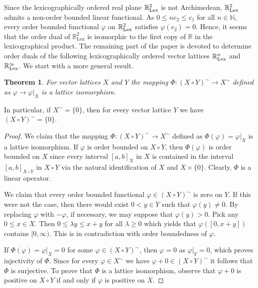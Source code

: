 \documentclass[12pt,reqno]{amsart}
\theoremstyle{plain}
\newtheorem{theorem}{Theorem}[section]
\theoremstyle{definition}
\begin{document}
Since the lexicographically ordered real plane $\mathbb R^2_{\rm{Lex}}$ is not Archimedean, $\mathbb R^2_{\rm{Lex}}$ admits a non-order bounded linear functional. As $0\leq ne_2\leq e_1$ for all $n\in \mathbb N$, every order bounded functional $\varphi$ on $\mathbb R^2_{\rm{Lex}}$ satisfies $\varphi(e_2)=0$. Hence, it seems that the order dual of $\mathbb R^2_{\mathrm{Lex}}$ is isomorphic to the first copy of $\mathbb R$ in the lexicographical product. The remaining part of the paper is devoted to determine order duals of the following lexicographically ordered vector lattices $\mathbb R^n_{\rm{Lex}}$ and $\mathbb R^\infty_{\rm{Lex}}$. We start with a more general result. 


\begin{theorem}\label{order dual of lex}
For vector lattices $X$ and $Y$ the mapping
$\Phi\colon (X\circ Y)^\sim \to X^\sim$ defined as $\varphi \to \varphi|_X$ is a lattice isomorphism.
\end{theorem}

In particular, if $X^\sim=\{0\}$, then for every vector lattice $Y$ we have $(X\circ Y)^\sim=\{0\}$.

\begin{proof}
We claim that the mapping $\Phi\colon (X\circ Y)^\sim \to X^\sim$ defined as $\Phi(\varphi)=\varphi|_X$ is a lattice isomorphism.
If $\varphi$ is order bounded on $X\circ Y$, then $\Phi(\varphi)$ is order bounded on $X$ since every interval $[a,b]_X$ in $X$ is contained in the interval $[a,b]_{X\circ Y}$ in $X\circ Y$ via the natural identification of $X$ and $X\times\{0\}$.
Clearly, $\Phi$ is a linear operator.

We claim that every order bounded functional $\varphi \in (X\circ Y)^\sim$ is zero on $Y$.
If this were not the case, then there would exist $0<y\in Y$ such that $\varphi(y)\neq 0$. By replacing $\varphi$ with $-\varphi$, if necessary, we may suppose that $\varphi(y)>0$.  Pick any $0\leq x\in X$. Then $0\leq \lambda y\leq x+y$ for all $\lambda\geq 0$ which yields that $\varphi([0,x+y])$ contains  $[0,\infty)$. This is in contradiction with order boundedness of $\varphi$.


If $\Phi(\varphi)=\varphi|_X=0$ for some $\varphi\in (X\circ Y)^\sim$, then $\varphi=0$ as $\varphi|_Y=0$, which proves injectivity of $\Phi$.
Since for every $\varphi\in X^\sim$ we have $\varphi+0\in (X\circ Y)^\sim$ it follows that $\Phi$ is surjective.
To prove that $\Phi$ is a lattice isomorphism, observe that $\varphi+0$ is positive on $X\circ Y$ if and only if $\varphi$ is positive on $X$.
\end{proof}
\end{document}
